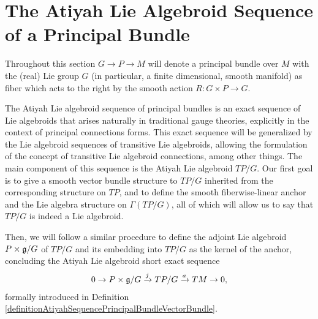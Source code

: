 





\section{The Atiyah Lie Algebroid Sequence of a Principal Bundle}

Throughout this section $G \to P \to M$ will denote a principal bundle over $M$ with the (real) Lie group $G$ (in particular, a finite dimensional, smooth manifold) as fiber which acts to the right by the smooth action $R: G \times P \to G$.

The Atiyah Lie algebroid sequence of principal bundles is an exact sequence of Lie algebroids that arises naturally in traditional gauge theories, explicitly in the context of principal connections forms. This exact sequence will be generalized by the Lie algebroid sequences of transitive Lie algebroids, allowing the formulation of the concept of transitive Lie algebroid connections, among other things. The main component of this sequence is the Atiyah Lie algebroid $TP/G$. Our first goal is to give a smooth vector bundle structure to $TP/G$ inherited from the corresponding structure on $TP$, and to define the smooth fiberwise-linear anchor and the Lie algebra structure on $\Gamma(TP/G)$, all of which will allow us to say that $TP/G$ is indeed a Lie algebroid.

Then, we will follow a similar procedure to define the adjoint Lie algebroid $P \times \mathfrak{g}/G$ of $TP/G$ and its embedding into $TP/G$ as the kernel of the anchor, concluding the Atiyah Lie algebroid short exact sequence
\begin{align*}
    0 \to P \times \mathfrak{g}/G \xrightarrow{j} TP/G \xrightarrow{a} TM \to 0,
\end{align*}
formally introduced in Definition \ref{definitionAtiyahSequencePrincipalBundleVectorBundle}.

